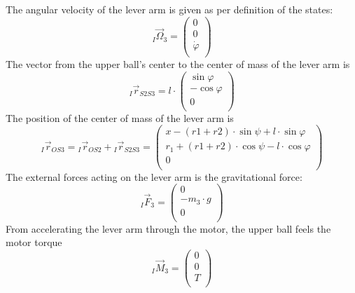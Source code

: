 \documentclass{article}
\begin{document}
The angular velocity of the lever arm is given as per definition of the states:
\begin{equation}
{}_I \vec{\Omega}_3 = 
\left( {\begin{array}{c} 0 \\ 0 \\ \dot{\varphi} \\ \end{array} } \right)
\end{equation}
The vector from the upper ball's center to the center of mass of the lever arm is
\begin{equation}
{}_I \vec{r}_{S2S3} = 
l \cdot \left( {\begin{array}{c} \sin{\varphi} \\ -\cos{\varphi} \\ 0 \\ \end{array} } \right)
\end{equation}
The position of the center of mass of the lever arm is
\begin{equation}
{}_I \vec{r}_{OS3} = {}_I \vec{r}_{OS2} + {}_I \vec{r}_{S2S3} =
\left( {\begin{array}{c} x - (r1+r2) \cdot \sin{\psi} + l \cdot \sin{\varphi} \\ r_1 + (r1+r2) \cdot \cos{\psi} - l \cdot \cos{\varphi} \\ 0 \\ \end{array} } \right)
\end{equation} 
The external forces acting on the lever arm is the gravitational force:
\begin{equation}
{}_I \vec{F}_{3} = \left( {\begin{array}{c} 0 \\ -m_3 \cdot g \\ 0 \\ \end{array} } \right)
\end{equation}
From accelerating the lever arm through the motor, the upper ball feels the motor torque
\begin{equation}
{}_I \vec{M}_{3} = \left( {\begin{array}{c} 0 \\ 0 \\ T \\ \end{array} } \right)
\end{equation}
\end{document}
